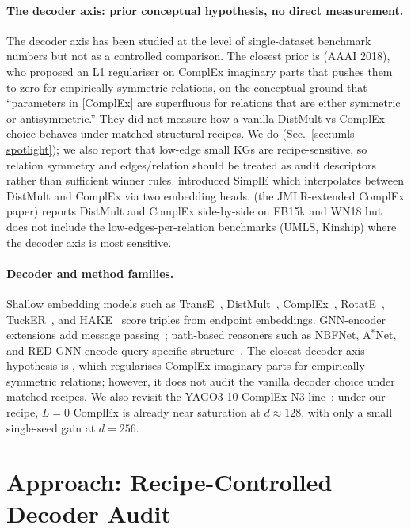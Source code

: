 \documentclass[runningheads]{llncs}
\begin{document}
\paragraph{The decoder axis: prior conceptual hypothesis, no direct measurement.}
The decoder axis has been studied at the level of single-dataset benchmark numbers but not as a controlled comparison. The closest prior is \cite{manabe2018datadependent} (AAAI 2018), who proposed an L1 regulariser on ComplEx imaginary parts that pushes them to zero for empirically-symmetric relations, on the conceptual ground that ``parameters in [ComplEx] are superfluous for relations that are either symmetric or antisymmetric.'' They did not measure how a vanilla DistMult-vs-ComplEx choice behaves under matched structural recipes. We do (Sec.~\ref{sec:umls-spotlight}); we also report that low-edge small KGs are recipe-sensitive, so relation symmetry and edges/relation should be treated as audit descriptors rather than sufficient winner rules. \cite{kazemi2018simple} introduced SimplE which interpolates between DistMult and ComplEx via two embedding heads. \cite{trouillon2017complex} (the JMLR-extended ComplEx paper) reports DistMult and ComplEx side-by-side on FB15k and WN18 but does not include the low-edges-per-relation benchmarks (UMLS, Kinship) where the decoder axis is most sensitive.

\paragraph{Decoder and method families.}
Shallow embedding models such as TransE~\cite{transe}, DistMult~\cite{distmult}, ComplEx~\cite{complex}, RotatE~\cite{rotate}, TuckER~\cite{balazevic2019tucker}, and HAKE~\cite{hake} score triples from endpoint embeddings. GNN-encoder extensions add message passing~\cite{rgcn,compgcn,chen2021hitter}; path-based reasoners such as NBFNet, A$^*$Net, and RED-GNN encode query-specific structure~\cite{nbfnet,astarnet,redgnn}. The closest decoder-axis hypothesis is \cite{manabe2018datadependent}, which regularises ComplEx imaginary parts for empirically symmetric relations; however, it does not audit the vanilla decoder choice under matched recipes. We also revisit the YAGO3-10 ComplEx-N3 line~\cite{lacroix2018complex}: under our recipe, $L{=}0$ ComplEx is already near saturation at $d{\approx}128$, with only a small single-seed gain at $d{=}256$.

\section{Approach: Recipe-Controlled Decoder Audit}
\label{sec:method}
\end{document}
